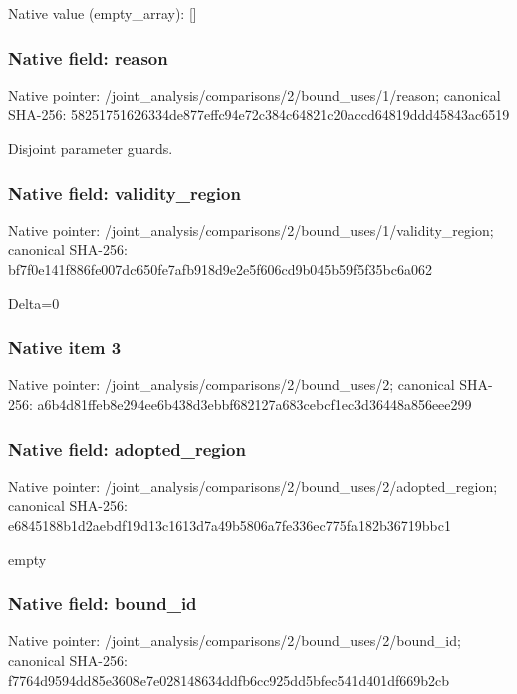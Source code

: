\documentclass[10pt,a4paper]{article}
\begin{document}
Native value (empty\_\allowbreak{}array): []

\subsubsection{Native field: reason}
Native pointer: /joint\_\allowbreak{}analysis/comparisons/2/bound\_\allowbreak{}uses/1/reason; canonical SHA-256: 58251751626334de877effc94e72c384c64821c20accd64819ddd45843ac6519

\begingroup\raggedright\sloppy Disjoint parameter guards.\par\endgroup

\subsubsection{Native field: validity\_\allowbreak{}region}
Native pointer: /joint\_\allowbreak{}analysis/comparisons/2/bound\_\allowbreak{}uses/1/validity\_\allowbreak{}region; canonical SHA-256: bf7f0e141f886fe007dc650fe7afb918d9e2e5f606cd9b045b59f5f35bc6a062

\begingroup\raggedright\sloppy Delta=\allowbreak{}0\par\endgroup

\subsubsection{Native item 3}
Native pointer: /joint\_\allowbreak{}analysis/comparisons/2/bound\_\allowbreak{}uses/2; canonical SHA-256: a6b4d81ffeb8e294ee6b438d3ebbf682127a683cebcf1ec3d36448a856eee299

\subsubsection{Native field: adopted\_\allowbreak{}region}
Native pointer: /joint\_\allowbreak{}analysis/comparisons/2/bound\_\allowbreak{}uses/2/adopted\_\allowbreak{}region; canonical SHA-256: e6845188b1d2aebdf19d13c1613d7a49b5806a7fe336ec775fa182b36719bbc1

\begingroup\raggedright\sloppy empty\par\endgroup

\subsubsection{Native field: bound\_\allowbreak{}id}
Native pointer: /joint\_\allowbreak{}analysis/comparisons/2/bound\_\allowbreak{}uses/2/bound\_\allowbreak{}id; canonical SHA-256: f7764d9594dd85e3608e7e028148634ddfb6cc925dd5bfec541d401df669b2cb
\end{document}
